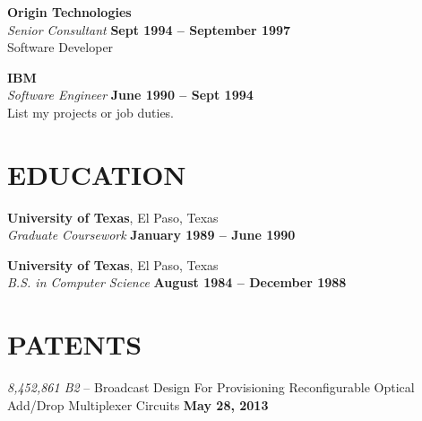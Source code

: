 \documentclass[margin,line]{resume}
\begin{document}
\begin{resume}
    \textbf{\listing Origin Technologies} \vspace{2mm}\\\vspace{1mm}%
    \textsl{Senior Consultant} \hfill \textbf{Sept 1994 -- September 1997}\\
    Software Developer
    
    \textbf{\listing IBM} \vspace{2mm}\\\vspace{1mm}%
    \textsl{Software Engineer} \hfill \textbf{June 1990 -- Sept 1994}\\
    List my projects or job duties.
    

    \vspace{-1mm}

\sectionline


    \section{\mysidestyle \textbf{\large{E}\small{DUCATION}}}

    \textbf{\listing University of Texas}, El Paso, Texas \vspace{1mm}\\
    \textsl{Graduate Coursework} \hfill \textbf{January 1989 -- June 1990}\vspace{-3mm}\\\vspace{-1mm}%

    \textbf{\listing University of Texas}, El Paso, Texas \vspace{1mm}\\
    \textsl{B.S. in Computer Science} \hfill \textbf{August 1984 -- December 1988}\vspace{-3mm}\\\vspace{-1mm}%

    \vspace{-1mm}

\sectionline

    \section{\mysidestyle \textbf{\large{P}\small{ATENTS}}}
    \textsl{8,452,861 B2} -- Broadcast Design For Provisioning Reconfigurable Optical Add/Drop Multiplexer Circuits \hfill \textbf{May 28, 2013}\\
    \vspace{-4mm}


\end{resume}
\end{document}

